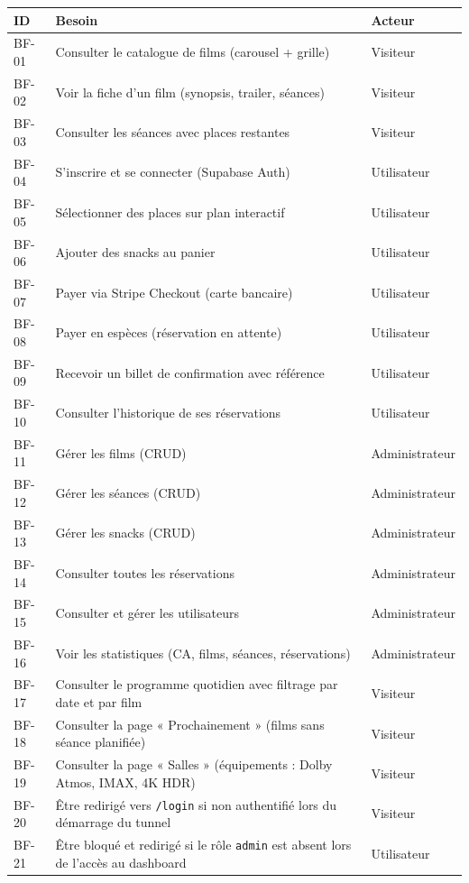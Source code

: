\documentclass[12pt,a4paper,openany]{report}
\begin{document}
\begin{longtable}{lp{9cm}l}
  \toprule
  \textbf{ID} & \textbf{Besoin} & \textbf{Acteur} \\
  \midrule
  \endhead
  \bottomrule
  \endfoot
  BF-01 & Consulter le catalogue de films (carousel + grille) & Visiteur \\
  BF-02 & Voir la fiche d'un film (synopsis, trailer, séances) & Visiteur \\
  BF-03 & Consulter les séances avec places restantes & Visiteur \\
  BF-04 & S'inscrire et se connecter (Supabase Auth) & Utilisateur \\
  BF-05 & Sélectionner des places sur plan interactif & Utilisateur \\
  BF-06 & Ajouter des snacks au panier & Utilisateur \\
  BF-07 & Payer via Stripe Checkout (carte bancaire) & Utilisateur \\
  BF-08 & Payer en espèces (réservation en attente) & Utilisateur \\
  BF-09 & Recevoir un billet de confirmation avec référence & Utilisateur \\
  BF-10 & Consulter l'historique de ses réservations & Utilisateur \\
  BF-11 & Gérer les films (CRUD) & Administrateur \\
  BF-12 & Gérer les séances (CRUD) & Administrateur \\
  BF-13 & Gérer les snacks (CRUD) & Administrateur \\
  BF-14 & Consulter toutes les réservations & Administrateur \\
  BF-15 & Consulter et gérer les utilisateurs & Administrateur \\
  BF-16 & Voir les statistiques (CA, films, séances, réservations) & Administrateur \\
  \midrule
  BF-17 & Consulter le programme quotidien avec filtrage par date et par film & Visiteur \\
  BF-18 & Consulter la page « Prochainement » (films sans séance planifiée) & Visiteur \\
  BF-19 & Consulter la page « Salles » (équipements : Dolby Atmos, IMAX, 4K HDR) & Visiteur \\
  BF-20 & Être redirigé vers \texttt{/login} si non authentifié lors du démarrage du tunnel & Visiteur \\
  BF-21 & Être bloqué et redirigé si le rôle \texttt{admin} est absent lors de l'accès au dashboard & Utilisateur \\

\end{longtable}
\end{document}
